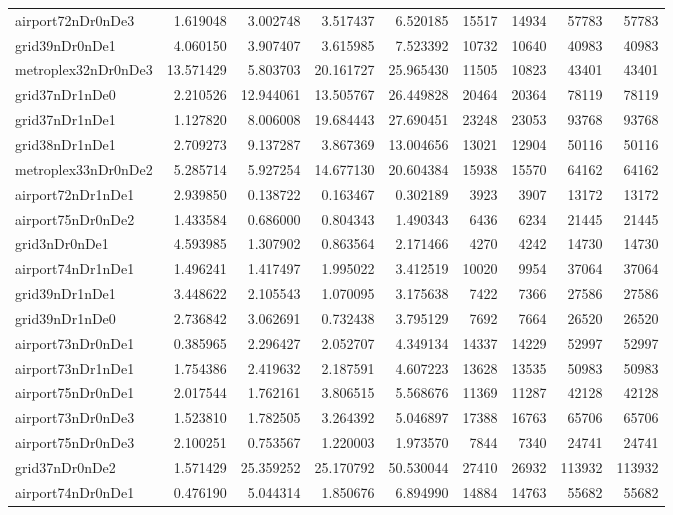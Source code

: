 \begin{longtable}{|l|r|r|r|r|r|r|r|r|}
airport72nDr0nDe3 & 1.619048 & 3.002748 & 3.517437 & 6.520185 & 15517 & 14934 & 57783 & 57783 \\
grid39nDr0nDe1 & 4.060150 & 3.907407 & 3.615985 & 7.523392 & 10732 & 10640 & 40983 & 40983 \\
metroplex32nDr0nDe3 & 13.571429 & 5.803703 & 20.161727 & 25.965430 & 11505 & 10823 & 43401 & 43401 \\
grid37nDr1nDe0 & 2.210526 & 12.944061 & 13.505767 & 26.449828 & 20464 & 20364 & 78119 & 78119 \\
grid37nDr1nDe1 & 1.127820 & 8.006008 & 19.684443 & 27.690451 & 23248 & 23053 & 93768 & 93768 \\
grid38nDr1nDe1 & 2.709273 & 9.137287 & 3.867369 & 13.004656 & 13021 & 12904 & 50116 & 50116 \\
metroplex33nDr0nDe2 & 5.285714 & 5.927254 & 14.677130 & 20.604384 & 15938 & 15570 & 64162 & 64162 \\
airport72nDr1nDe1 & 2.939850 & 0.138722 & 0.163467 & 0.302189 & 3923 & 3907 & 13172 & 13172 \\
airport75nDr0nDe2 & 1.433584 & 0.686000 & 0.804343 & 1.490343 & 6436 & 6234 & 21445 & 21445 \\
grid3nDr0nDe1 & 4.593985 & 1.307902 & 0.863564 & 2.171466 & 4270 & 4242 & 14730 & 14730 \\
airport74nDr1nDe1 & 1.496241 & 1.417497 & 1.995022 & 3.412519 & 10020 & 9954 & 37064 & 37064 \\
grid39nDr1nDe1 & 3.448622 & 2.105543 & 1.070095 & 3.175638 & 7422 & 7366 & 27586 & 27586 \\
grid39nDr1nDe0 & 2.736842 & 3.062691 & 0.732438 & 3.795129 & 7692 & 7664 & 26520 & 26520 \\
airport73nDr0nDe1 & 0.385965 & 2.296427 & 2.052707 & 4.349134 & 14337 & 14229 & 52997 & 52997 \\
airport73nDr1nDe1 & 1.754386 & 2.419632 & 2.187591 & 4.607223 & 13628 & 13535 & 50983 & 50983 \\
airport75nDr0nDe1 & 2.017544 & 1.762161 & 3.806515 & 5.568676 & 11369 & 11287 & 42128 & 42128 \\
airport73nDr0nDe3 & 1.523810 & 1.782505 & 3.264392 & 5.046897 & 17388 & 16763 & 65706 & 65706 \\
airport75nDr0nDe3 & 2.100251 & 0.753567 & 1.220003 & 1.973570 & 7844 & 7340 & 24741 & 24741 \\
grid37nDr0nDe2 & 1.571429 & 25.359252 & 25.170792 & 50.530044 & 27410 & 26932 & 113932 & 113932 \\
airport74nDr0nDe1 & 0.476190 & 5.044314 & 1.850676 & 6.894990 & 14884 & 14763 & 55682 & 55682 \\

\end{longtable}
